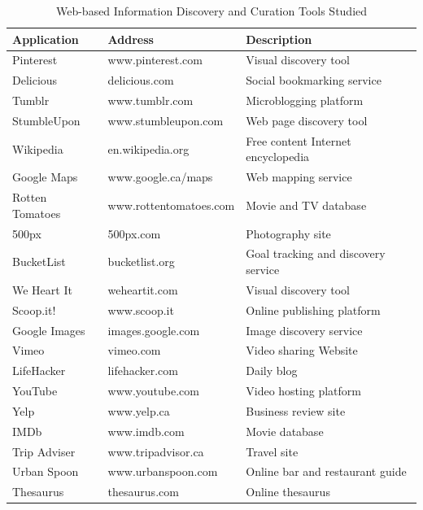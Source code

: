 \documentclass{sigchi}
\begin{document}
{\begin{table}[htbp]
\begin{tabular}{|p{}| p{}| p{}|}
\hline
\textbf{Application} & \textbf{Address} & \textbf{Description}
\\
\hline
Pinterest       & www.pinterest.com 	& Visual discovery tool \\
\hline
Delicious       & delicious.com 		& Social bookmarking service \\
\hline
Tumblr          & www.tumblr.com 		& Microblogging platform \\
\hline
StumbleUpon     & www.stumbleupon.com  	& Web page discovery tool \\
\hline
Wikipedia       & en.wikipedia.org   	& Free content Internet encyclopedia\\
\hline
Google Maps     & www.google.ca/maps  	& Web mapping service\\
\hline
Rotten Tomatoes & www.rottentomatoes.com & Movie and TV database\\
\hline
500px           & 500px.com            	& Photography site\\
\hline
BucketList      & bucketlist.org  		& Goal tracking and discovery service\\
\hline
We Heart It     & weheartit.com 		& Visual discovery tool \\
\hline
Scoop.it!       & www.scoop.it 			& Online publishing platform \\
\hline
Google Images   & images.google.com  	& Image discovery service \\
\hline
Vimeo           & vimeo.com  			& Video sharing Website\\
\hline
LifeHacker      & lifehacker.com        & Daily blog \\
\hline
YouTube         & www.youtube.com 		& Video hosting platform \\
\hline
Yelp            & www.yelp.ca  			& Business review site\\
\hline
IMDb            & www.imdb.com  		& Movie database \\
\hline
Trip Adviser    & www.tripadvisor.ca 	& Travel site \\
\hline
Urban Spoon     & www.urbanspoon.com    & Online bar and restaurant guide\\
\hline
Thesaurus       & thesaurus.com         & Online thesaurus \\
\hline
\end{tabular}
\caption{Web-based Information Discovery and Curation Tools Studied}
\label{table:tools} 
\end{table}
} %
\end{document}
